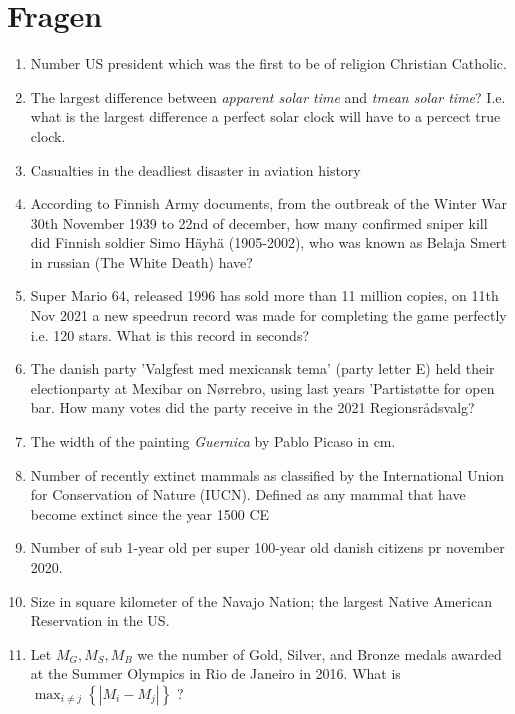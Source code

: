 \documentclass[12pt,a4paper]{article}
\begin{document}
\section*{Fragen}
\begin{enumerate}

\item Number US president which was the first to be of religion Christian Catholic.

\item The largest difference between \textit{apparent solar time} and \textit{tmean solar time}? I.e. what is the largest difference a perfect solar clock will have to a percect true clock.

\item Casualties in the deadliest disaster in aviation history

\item According to Finnish Army documents, from the outbreak of the Winter War 30th November 1939 to 22nd of december, how many confirmed sniper kill did Finnish soldier Simo Häyhä (1905-2002), who was known as Belaja Smert in russian (The White Death) have?

\item Super Mario 64, released 1996 has sold more than 11 million copies, on 11th Nov 2021 a new speedrun record was made for completing the game perfectly i.e. 120 stars. What is this record in seconds? 

\item The danish party 'Valgfest med mexicansk tema' (party letter E) held their electionparty at Mexibar on Nørrebro, using last years 'Partistøtte for open bar. How many votes did the party receive in the 2021 Regionsrådsvalg?

 \item The width of the painting \textit{Guernica} by Pablo Picaso in cm.


 \item Number of recently extinct mammals as classified by the International Union for Conservation of Nature (IUCN). Defined as any mammal that have become extinct since the year 1500 CE

  \item Number of sub 1-year old per super 100-year old danish citizens pr november 2020.
  
  \item Size in square kilometer of the Navajo Nation; the largest Native American Reservation in the US.
  
  \item Let $M_G, M_S, M_B$ we the number of Gold, Silver, and Bronze medals awarded at the Summer Olympics in Rio de Janeiro in 2016. What is $\max_{i \neq j} \left\{ |M_i - M_j| \right\}$ ?
  

\end{enumerate}
\end{document}
